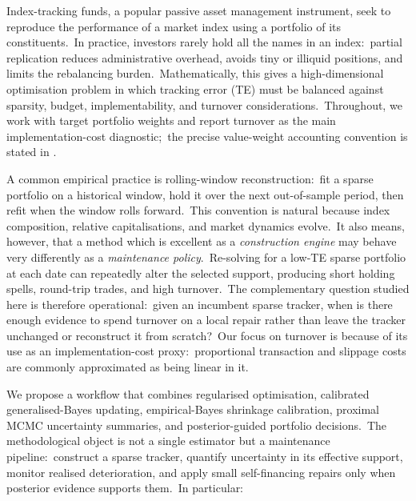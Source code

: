 \documentclass[11pt]{article}
\begin{document}
Index-tracking funds, a popular passive asset management instrument, seek to reproduce the performance of a market index using a portfolio of its constituents.\ In practice, investors rarely hold all the names in an index:\ partial replication reduces administrative overhead, avoids tiny or illiquid positions, and limits the rebalancing burden.\ Mathematically, this gives a high-dimensional optimisation problem in which tracking error (TE) must be balanced against sparsity, budget, implementability, and turnover considerations.\
Throughout, we work with target portfolio weights and report turnover as the main implementation-cost diagnostic;\ the precise value-weight accounting convention is stated in .

A common empirical practice is rolling-window reconstruction:\ fit a sparse portfolio on a historical window, hold it over the next out-of-sample period, then refit when the window rolls forward.\ This convention is natural because index composition, relative capitalisations, and market dynamics evolve.\ It also means, however, that a method which is excellent as a \emph{construction engine} may behave very differently as a \emph{maintenance policy}.\ Re-solving for a low-TE sparse portfolio at each date can repeatedly alter the selected support, producing short holding spells, round-trip trades, and high turnover.\ The complementary question studied here is therefore operational:\ given an incumbent sparse tracker, when is there enough evidence to spend turnover on a local repair rather than leave the tracker unchanged or reconstruct it from scratch?\ Our focus on turnover is because of its use as an implementation-cost proxy:\ proportional transaction and slippage costs are commonly approximated as being linear in it.\ 

We propose a workflow that combines regularised optimisation, calibrated generalised-Bayes updating, empirical-Bayes shrinkage calibration, proximal MCMC uncertainty summaries, and posterior-guided portfolio decisions.\ The methodological object is not a single estimator but a maintenance pipeline:\ construct a sparse tracker, quantify uncertainty in its effective support, monitor realised deterioration, and apply small self-financing repairs only when posterior evidence supports them.\ In particular:
\end{document}
